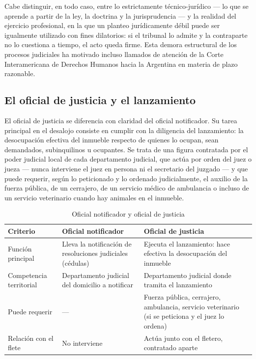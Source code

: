 \documentclass[12pt,oneside]{book}
\begin{document}

Cabe distinguir, en todo caso, entre lo estrictamente técnico-jurídico --- lo que se aprende a partir de la ley, la doctrina y la jurisprudencia --- y la realidad del ejercicio profesional, en la que un planteo jurídicamente débil puede ser igualmente utilizado con fines dilatorios: si el tribunal lo admite y la contraparte no lo cuestiona a tiempo, el acto queda firme. Esta demora estructural de los procesos judiciales ha motivado incluso llamados de atención de la Corte Interamericana de Derechos Humanos hacia la Argentina en materia de plazo razonable.

\subsection{El oficial de justicia y el lanzamiento}

El oficial de justicia se diferencia con claridad del oficial notificador. Su tarea principal en el desalojo consiste en cumplir con la diligencia del lanzamiento: la desocupación efectiva del inmueble respecto de quienes lo ocupan, sean demandados, subinquilinos u ocupantes. Se trata de una figura contratada por el poder judicial local de cada departamento judicial, que actúa por orden del juez o jueza --- nunca interviene el juez en persona ni el secretario del juzgado --- y que puede requerir, según lo peticionado y lo ordenado judicialmente, el auxilio de la fuerza pública, de un cerrajero, de un servicio médico de ambulancia o incluso de un servicio veterinario cuando hay animales en el inmueble.

\begin{table}[H]
\centering
\caption{Oficial notificador y oficial de justicia}
\begin{tabularx}{\textwidth}{>{\raggedright\arraybackslash}p{} >{\raggedright\arraybackslash}X >{\raggedright\arraybackslash}X}
\toprule
\textbf{Criterio} & \textbf{Oficial notificador} & \textbf{Oficial de justicia} \\
\midrule
Función principal & Lleva la notificación de resoluciones judiciales (cédulas) & Ejecuta el lanzamiento: hace efectiva la desocupación del inmueble \\
Competencia territorial & Departamento judicial del domicilio a notificar & Departamento judicial donde tramita el lanzamiento \\
Puede requerir & --- & Fuerza pública, cerrajero, ambulancia, servicio veterinario (si se peticiona y el juez lo ordena) \\
Relación con el flete & No interviene & Actúa junto con el fletero, contratado aparte \\
\bottomrule
\end{tabularx}
\end{table}
\end{document}
